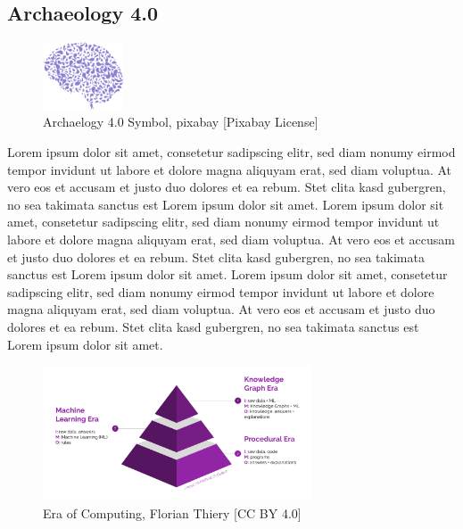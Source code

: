 \documentclass[twocolumn]{autart}
\begin{document}
\subsection{Archaeology 4.0}

\begin{figure}[!htb]
\begin{center}
\includegraphics[height=2cm]{a40.png}    %
\caption{Archaelogy 4.0 Symbol, pixabay [Pixabay License]}  %
\label{figa40symbol}                                 %
\end{center}                                 %
\end{figure}

Lorem ipsum dolor sit amet, consetetur sadipscing elitr, sed diam nonumy eirmod tempor invidunt ut labore et dolore magna aliquyam erat, sed diam voluptua. At vero eos et accusam et justo duo dolores et ea rebum. Stet clita kasd gubergren, no sea takimata sanctus est Lorem ipsum dolor sit amet. Lorem ipsum dolor sit amet, consetetur sadipscing elitr, sed diam nonumy eirmod tempor invidunt ut labore et dolore magna aliquyam erat, sed diam voluptua. At vero eos et accusam et justo duo dolores et ea rebum. Stet clita kasd gubergren, no sea takimata sanctus est Lorem ipsum dolor sit amet. Lorem ipsum dolor sit amet, consetetur sadipscing elitr, sed diam nonumy eirmod tempor invidunt ut labore et dolore magna aliquyam erat, sed diam voluptua. At vero eos et accusam et justo duo dolores et ea rebum. Stet clita kasd gubergren, no sea takimata sanctus est Lorem ipsum dolor sit amet. 

\cite{mccreary_computing}

\cite{hey_computing}

\begin{figure}[!htb]
\begin{center}
\includegraphics[width=8cm]{Era_of_Computing.png}    %
\caption{Era of Computing, Florian Thiery [CC BY 4.0]}  %
\label{figeoc}                                 %
\end{center}                                 %
\end{figure}
\end{document}
